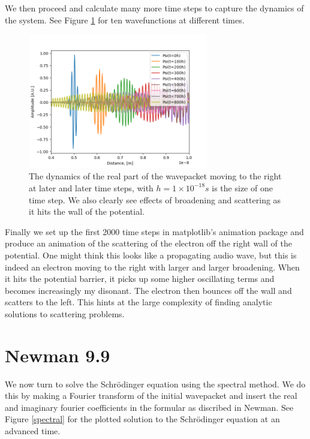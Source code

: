 \documentclass[11pt]{article}
\begin{document}
We then proceed and calculate many more time steps to capture the dynamics of the system. See Figure \ref{ten} for ten wavefunctions at different times.
\begin{figure}[!htbp]
    \centering
    \includegraphics[width=0.7\textwidth]{10 waves.png}
    \caption{The dynamics of the real part of the wavepacket moving to the right at later and later time steps, with $h=1\times 10^{-18}s$ is the size of one time step. We also clearly see effects of broadening and scattering as it hits the wall of the potential.}
    \label{ten}
\end{figure}

Finally we set up the first 2000 time steps in matplotlib's animation package and produce an animation of the scattering of the electron off the right wall of the potential. One might think this looks like a propagating audio wave, but this is indeed an electron moving to the right with larger and larger broadening. When it hits the potential barrier, it picks up some higher oscillating terms and becomes increasingly my disonant. The electron then bounces off the wall and scatters to the left. This hints at the large complexity of finding analytic solutions to scattering problems. 


\section{Newman 9.9}

We now turn to solve the Schrödinger equation using the spectral method. We do this by making a Fourier transform of the initial wavepacket and insert the real and imaginary fourier coefficients in the formular as discribed in Newman. See Figure \ref{spectral} for the plotted solution to the Schrödinger equation at an advanced time. 
\end{document}
